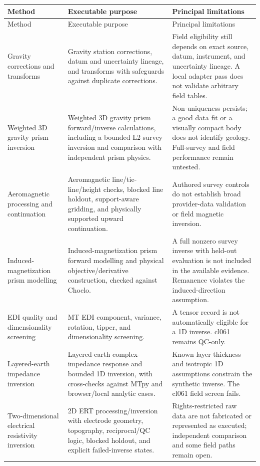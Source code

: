\begin{center}\small
\begin{longtable}{@{}>{\raggedright\arraybackslash}p{}>{\raggedright\arraybackslash}p{}>{\raggedright\arraybackslash}p{}@{}}
\toprule
Method & Executable purpose & Principal limitations \\
\midrule
\endfirsthead
\toprule
Method & Executable purpose & Principal limitations \\
\midrule
\endhead
Gravity corrections and transforms & Gravity station corrections, datum and uncertainty lineage, and transforms with safeguards against duplicate corrections. & Field eligibility still depends on exact source, datum, instrument, and uncertainty lineage. A local adapter pass does not validate arbitrary field tables. \\
Weighted 3D gravity prism inversion & Weighted 3D gravity prism forward/inverse calculations, including a bounded L2 survey inversion and comparison with independent prism physics. & Non-uniqueness persists; a good data fit or a visually compact body does not identify geology. Full-survey and field performance remain untested. \\
Aeromagnetic processing and continuation & Aeromagnetic line/tie-line/height checks, blocked line holdout, support-aware gridding, and physically supported upward continuation. & Authored survey controls do not establish broad provider-data validation or field magnetic inversion. \\
Induced-magnetization prism modelling & Induced-magnetization prism forward modelling and physical objective/derivative construction, checked against Choclo. & A full nonzero survey inverse with held-out evaluation is not included in the available evidence. Remanence violates the induced-direction assumption. \\
EDI quality and dimensionality screening & MT EDI component, variance, rotation, tipper, and dimensionality screening. & A tensor record is not automatically eligible for a 1D inverse. cl061 remains QC-only. \\
Layered-earth impedance inversion & Layered-earth complex-impedance response and bounded 1D inversion, with cross-checks against MTpy and browser/local analytic cases. & Known layer thickness and isotropic 1D assumptions constrain the synthetic inverse. The cl061 field screen fails. \\
Two-dimensional electrical resistivity inversion & 2D ERT processing/inversion with electrode geometry, topography, reciprocal/QC logic, blocked holdout, and explicit failed-inverse states. & Rights-restricted raw data are not fabricated or represented as executed; independent comparison and some field paths remain open. \\

\end{longtable}
\end{center}
